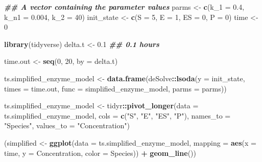 \documentclass[
]{article}
\newenvironment{Shaded}{\begin{snugshade}}{\end{snugshade}}
\newcommand{\AttributeTok}[1]{\textcolor[rgb]{0.13,0.29,0.53}{#1}}
\newcommand{\DecValTok}[1]{\textcolor[rgb]{0.00,0.00,0.81}{#1}}
\newcommand{\DocumentationTok}[1]{\textcolor[rgb]{0.56,0.35,0.01}{\textbf{\textit{#1}}}}
\newcommand{\FloatTok}[1]{\textcolor[rgb]{0.00,0.00,0.81}{#1}}
\newcommand{\FunctionTok}[1]{\textcolor[rgb]{0.13,0.29,0.53}{\textbf{#1}}}
\newcommand{\NormalTok}[1]{#1}
\newcommand{\OtherTok}[1]{\textcolor[rgb]{0.56,0.35,0.01}{#1}}
\newcommand{\SpecialCharTok}[1]{\textcolor[rgb]{0.81,0.36,0.00}{\textbf{#1}}}
\newcommand{\StringTok}[1]{\textcolor[rgb]{0.31,0.60,0.02}{#1}}
\begin{document}
\begin{Shaded}
\begin{Highlighting}[]
\DocumentationTok{\#\# A vector containing the parameter values}
\NormalTok{parms }\OtherTok{\textless{}{-}} \FunctionTok{c}\NormalTok{(}\AttributeTok{k\_1 =} \FloatTok{0.4}\NormalTok{, }\AttributeTok{k\_n1 =} \FloatTok{0.004}\NormalTok{, }\AttributeTok{k\_2 =} \DecValTok{40}\NormalTok{)}
\NormalTok{init\_state }\OtherTok{\textless{}{-}} \FunctionTok{c}\NormalTok{(}\AttributeTok{S =} \DecValTok{5}\NormalTok{, }\AttributeTok{E =} \DecValTok{1}\NormalTok{, }\AttributeTok{ES =} \DecValTok{0}\NormalTok{, }\AttributeTok{P =} \DecValTok{0}\NormalTok{)}
\NormalTok{time }\OtherTok{\textless{}{-}} \DecValTok{0}

\FunctionTok{library}\NormalTok{(tidyverse)}
\NormalTok{delta.t }\OtherTok{\textless{}{-}} \FloatTok{0.1}  \DocumentationTok{\#\# 0.1 hours}

\NormalTok{time.out }\OtherTok{\textless{}{-}} \FunctionTok{seq}\NormalTok{(}\DecValTok{0}\NormalTok{, }\DecValTok{20}\NormalTok{, }\AttributeTok{by =}\NormalTok{ delta.t)}

\NormalTok{ts.simplified\_enzyme\_model }\OtherTok{\textless{}{-}} \FunctionTok{data.frame}\NormalTok{(deSolve}\SpecialCharTok{::}\FunctionTok{lsoda}\NormalTok{(}\AttributeTok{y =}\NormalTok{ init\_state,}
    \AttributeTok{times =}\NormalTok{ time.out, }\AttributeTok{func =}\NormalTok{ simplified\_enzyme\_model,}
    \AttributeTok{parms =}\NormalTok{ parms))}

\NormalTok{ts.simplified\_enzyme\_model }\OtherTok{\textless{}{-}}\NormalTok{ tidyr}\SpecialCharTok{::}\FunctionTok{pivot\_longer}\NormalTok{(}\AttributeTok{data =}\NormalTok{ ts.simplified\_enzyme\_model,}
    \AttributeTok{cols =} \FunctionTok{c}\NormalTok{(}\StringTok{"S"}\NormalTok{, }\StringTok{"E"}\NormalTok{, }\StringTok{"ES"}\NormalTok{, }\StringTok{"P"}\NormalTok{), }\AttributeTok{names\_to =} \StringTok{"Species"}\NormalTok{,}
    \AttributeTok{values\_to =} \StringTok{"Concentration"}\NormalTok{)}

\NormalTok{(simplified }\OtherTok{\textless{}{-}} \FunctionTok{ggplot}\NormalTok{(}\AttributeTok{data =}\NormalTok{ ts.simplified\_enzyme\_model,}
    \AttributeTok{mapping =} \FunctionTok{aes}\NormalTok{(}\AttributeTok{x =}\NormalTok{ time, }\AttributeTok{y =}\NormalTok{ Concentration, }\AttributeTok{color =}\NormalTok{ Species)) }\SpecialCharTok{+}
    \FunctionTok{geom\_line}\NormalTok{())}
\end{Highlighting}
\end{Shaded}
\end{document}
